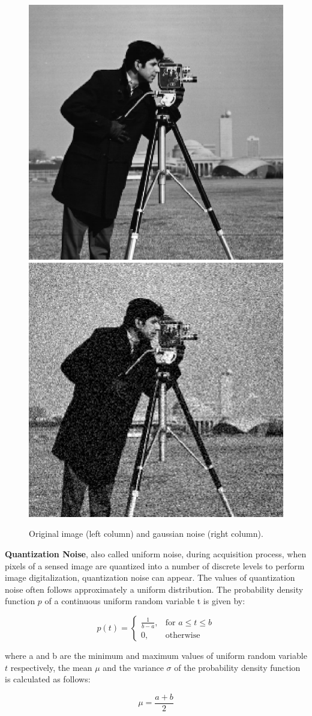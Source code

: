\begin{figure}
    \centering 
    \includegraphics[width=0.4\columnwidth]{images/salt_pepper_origin.jpg}
    \includegraphics[width=0.4\columnwidth]{images/gaussian_noise.jpg}
	\caption{Original image (left column) and gaussian noise (right column).}
	\label{fig:gaussian_noise}
\end{figure}

\textbf{Quantization Noise}, also called uniform noise, during acquisition process, when pixels of a sensed image are quantized into a number of discrete levels to perform image digitalization, quantization noise can appear. The values of quantization noise often follows approximately a uniform distribution. The probability density function $p$ of a continuous uniform random variable t is given by: 
 
\begin{equation}
    p(t)= 
\begin{cases}
    \frac{1}{b-a}, & \text{for } a \leq t \leq b \\
    0,              & \text{otherwise}
\end{cases}
\end{equation}

where a and b are the minimum and maximum values of uniform random variable $t$ respectively, the mean $\mu$ and the variance $\sigma$ of the probability density function is calculated as follows:

\begin{equation}
\mu = \frac{a+b}{2} 
\end{equation}

